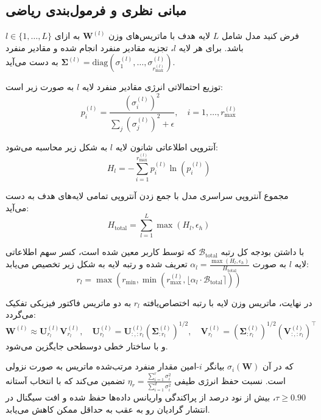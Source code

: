 \subsection{مبانی نظری و فرمول‌بندی ریاضی}
فرض کنید مدل شامل $L$ لایه هدف با ماتریس‌های وزن $\mathbf{W}^{(l)}$ به ازای $l \in \{1, \dots, L\}$ باشد. برای هر لایه $l$، تجزیه مقادیر منفرد انجام شده و مقادیر منفرد $\mathbf{\Sigma}^{(l)} = \text{diag}(\sigma_1^{(l)}, \dots, \sigma_{r_{\text{max}}^{(l)}}^{(l)})$ به دست می‌آید.

توزیع احتمالاتی انرژی مقادیر منفرد لایه $l$ به صورت زیر است:
\begin{equation}
p_i^{(l)} = \frac{(\sigma_i^{(l)})^2}{\sum_{j} (\sigma_j^{(l)})^2 + \epsilon}, \quad i = 1, \dots, r_{\text{max}}^{(l)}
\end{equation}

آنتروپی اطلاعاتی شانون لایه $l$ به شکل زیر محاسبه می‌شود:
\begin{equation}
H_l = - \sum_{i=1}^{r_{\text{max}}^{(l)}} p_i^{(l)} \ln(p_i^{(l)})
\end{equation}

مجموع آنتروپی سراسری مدل با جمع زدن آنتروپی تمامی لایه‌های هدف به دست می‌آید:
\begin{equation}
H_{\text{total}} = \sum_{l=1}^L \max(H_l, \epsilon_h)
\end{equation}

با داشتن بودجه کل رتبه $\mathcal{B}_{\text{total}}$ که توسط کاربر معین شده است، کسر سهم اطلاعاتی لایه $l$ به صورت $\alpha_l = \frac{\max(H_l, \epsilon_h)}{H_{\text{total}}}$ تعریف شده و رتبه لایه به شکل زیر تخصیص می‌یابد:
\begin{equation}
r_l = \max\left(r_{\text{min}}, \min\left(r_{\text{max}}^{(l)}, \lfloor \alpha_l \cdot \mathcal{B}_{\text{total}} \rceil\right)\right)
\end{equation}

در نهایت، ماتریس وزن لایه با رتبه اختصاص‌یافته $r_l$ به دو ماتریس فاکتور فیزیکی تفکیک می‌گردد:
\begin{equation}
\mathbf{W}^{(l)} \approx \mathbf{U}_{r_l}^{(l)} \mathbf{V}_{r_l}^{(l)}, \quad \mathbf{U}_{r_l}^{(l)} = \mathbf{U}_{:, :r_l}^{(l)} (\mathbf{\Sigma}_{:r_l}^{(l)})^{1/2}, \quad \mathbf{V}_{r_l}^{(l)} = (\mathbf{\Sigma}_{:r_l}^{(l)})^{1/2} (\mathbf{V}_{:, :r_l}^{(l)})^\top
\end{equation}
و با ساختار خطی دوسطحی  جایگزین می‌شود.

که در آن $\sigma_i(\mathbf{W})$ بیانگر $i$-امین مقدار منفرد مرتب‌شده ماتریس به صورت نزولی است. نسبت حفظ انرژی طیفی $\eta_r = \frac{\sum_{i=1}^r \sigma_i^2}{\sum_{i=1}^{d} \sigma_i^2}$ تضمین می‌کند که با انتخاب آستانه $\tau \ge 0.90$، بیش از نود درصد از پراکندگی واریانس داده‌ها حفظ شده و افت سیگنال در انتشار گرادیان رو به عقب به حداقل ممکن کاهش می‌یابد.

